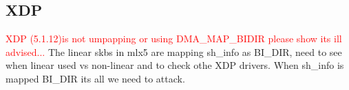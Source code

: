 \subsection{XDP}
\textcolor{red}{XDP (5.1.12)is not umpapping or using DMA\_MAP\_BIDIR \- please show its ill advised...} The linear skbs in mlx5 are mapping sh\_info as BI\_DIR, need to see when linear used vs non-linear and to check othe XDP drivers. When sh\_info is mapped BI\_DIR its all we need to attack. 